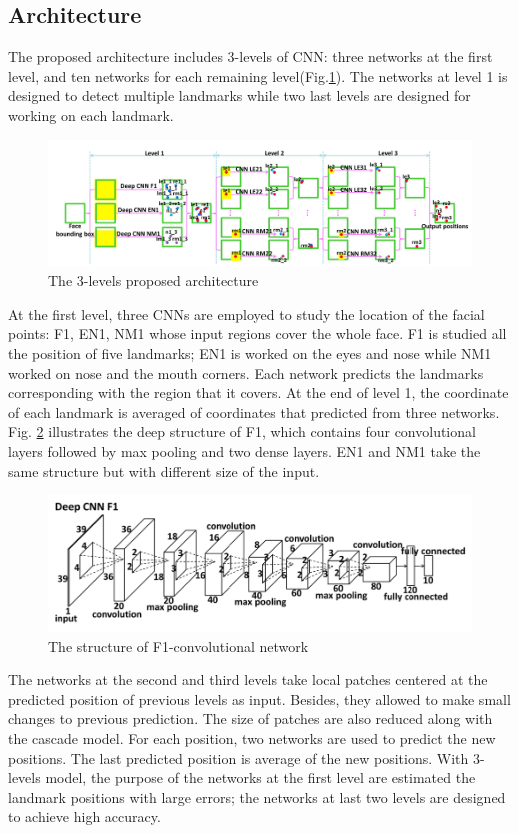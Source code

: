 \subsection{Architecture}
The proposed architecture includes 3-levels of CNN: three networks at the first level, and ten networks for each remaining level(Fig.\ref{3levels}). The networks at level 1 is designed to detect multiple landmarks while two last levels are designed for working on each landmark.
\begin{figure}[h]
	\centering
	\includegraphics[scale=0.35]{images/3levels}
	\caption{The 3-levels proposed architecture}
	\label{3levels}
\end{figure}

At the first level, three CNNs are employed to study the location of the facial points: F1, EN1, NM1 whose input regions cover the whole face. F1 is studied all the position of five landmarks; EN1 is worked on the eyes and nose while NM1 worked on nose and the mouth corners. Each network predicts the landmarks corresponding with the region that it covers. At the end of level 1, the coordinate of each landmark is averaged of coordinates that predicted from three networks. Fig. \ref{1Fconv} illustrates the deep structure of F1, which contains four convolutional layers followed by max pooling and two dense layers. EN1 and NM1 take the same structure but with different size of the input.
\begin{figure}[h]
	\centering
	\includegraphics[scale=0.3]{images/1Fconv}
	\caption{The structure of F1-convolutional network}
	\label{1Fconv}
\end{figure}

The networks at the second and third levels take local patches centered at the predicted position of previous levels as input. Besides, they allowed to make small changes to previous prediction. The size of patches are also reduced along with the cascade model. For each position, two networks are used to predict the new positions. The last predicted position is average of the new positions. With 3-levels model, the purpose of the networks at the first level are estimated the landmark positions with large errors; the networks at last two levels are designed to achieve high accuracy.
